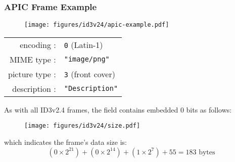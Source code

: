 \subsubsection{APIC Frame Example}
\begin{figure}[h]
\texttt{[image: figures/id3v24/apic-example.pdf]}
\end{figure}
\begin{table}[h]
\begin{tabular}{rl}
encoding : & \texttt{0} (Latin-1) \\
MIME type : & \texttt{"image/png"} \\
picture type : & \texttt{3} (front cover) \\
description : & \texttt{"Description"} \\
\end{tabular}
\end{table}
\par
\noindent
As with all ID3v2.4 frames, the  field contains
embedded 0 bits as follows:
\begin{figure}[h]
\texttt{[image: figures/id3v24/size.pdf]}
\end{figure}
\par
\noindent
which indicates the frame's data size is:
\begin{equation*}
(0 \times 2 ^ {21}) + (0 \times 2 ^ {14}) + (1 \times 2 ^ {7}) + 55 = 183 \text{ bytes}
\end{equation*}

\clearpage


